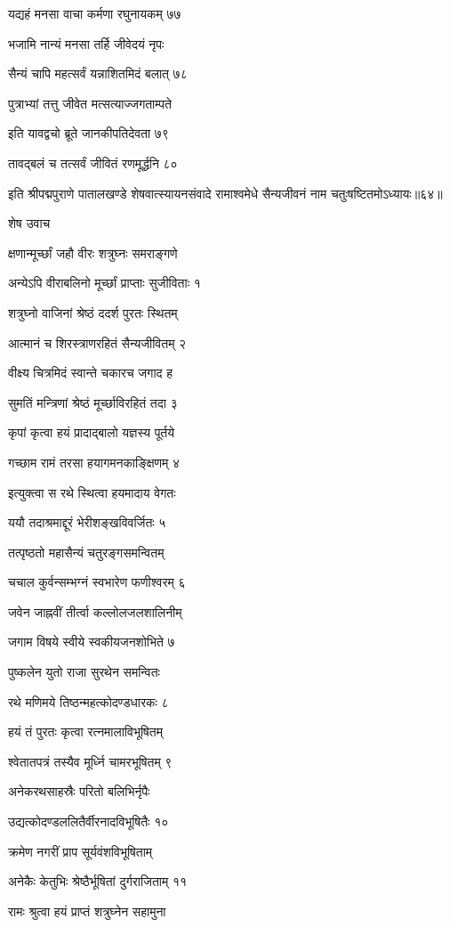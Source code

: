 यद्यहं मनसा वाचा कर्मणा रघुनायकम् ७७

भजामि नान्यं मनसा तर्हि जीवेदयं नृपः

सैन्यं चापि महत्सर्वं यन्नाशितमिदं बलात् ७८

पुत्राभ्यां तत्तु जीवेत मत्सत्याज्जगताम्पते

इति यावद्वचो ब्रूते जानकीपतिदेवता ७९

तावद्बलं च तत्सर्वं जीवितं रणमूर्द्धनि ८०

इति श्रीपद्मपुराणे पातालखण्डे शेषवात्स्यायनसंवादे रामाश्वमेधे सैन्यजीवनं नाम चतुःषष्टितमोऽध्यायः॥६४॥


शेष उवाच

क्षणान्मूर्च्छां जहौ वीरः शत्रुघ्नः समराङ्गणे

अन्येऽपि वीराबलिनो मूर्च्छां प्राप्ताः सुजीविताः १

शत्रुघ्नो वाजिनां श्रेष्ठं ददर्श पुरतः स्थितम्

आत्मानं च शिरस्त्राणरहितं सैन्यजीवितम् २

वीक्ष्य चित्रमिदं स्वान्ते चकारच जगाद ह

सुमतिं मन्त्रिणां श्रेष्ठं मूर्च्छाविरहितं तदा ३

कृपां कृत्वा हयं प्रादाद्बालो यज्ञस्य पूर्तये

गच्छाम रामं तरसा हयागमनकाङ्क्षिणम् ४

इत्युक्त्वा स रथे स्थित्वा हयमादाय वेगतः

ययौ तदाश्रमाद्दूरं भेरीशङ्खविवर्जितः ५

तत्पृष्ठतो महासैन्यं चतुरङ्गसमन्वितम्

चचाल कुर्वन्सम्भग्नं स्वभारेण फणीश्वरम् ६

जवेन जाह्नवीं तीर्त्वा कल्लोलजलशालिनीम्

जगाम विषये स्वीये स्वकीयजनशोभिते ७

पुष्कलेन युतो राजा सुरथेन समन्वितः

रथे मणिमये तिष्ठन्महत्कोदण्डधारकः ८

हयं तं पुरतः कृत्वा रत्नमालाविभूषितम्

श्वेतातपत्रं तस्यैव मूर्ध्नि चामरभूषितम् ९

अनेकरथसाहस्रैः परितो बलिभिर्नृपैः

उद्यत्कोदण्डललितैर्वीरनादविभूषितैः १०

क्रमेण नगरीं प्राप सूर्यवंशविभूषिताम्

अनेकैः केतुभिः श्रेष्ठैर्भूषितां दुर्गराजिताम् ११

रामः श्रुत्वा हयं प्राप्तं शत्रुघ्नेन सहामुना

